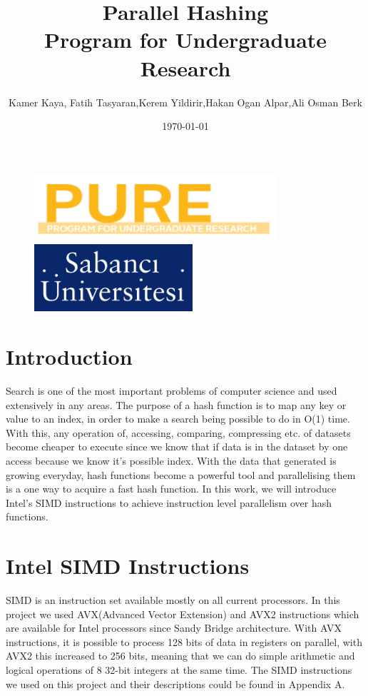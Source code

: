 \documentclass[11pt,oneside,a4paper]{article}
\title{\vspace*{40.0mm}
  \bf\sf Parallel Hashing
         \vspace*{20.0mm} \\
  \vspace*{40.0mm}
  \Large\bf\sf Program for Undergraduate Research \vspace*{20.0mm}}
\author{\sf Kamer Kaya, Fatih Tasyaran,Kerem Yildirir,Hakan Ogan Alpar,Ali Osman Berk}
\date{\sf \today}
\makeatletter
\def\cleardoublepage{\clearpage\if@twoside \ifodd\c@page\else%
\hbox{}%
\thispagestyle{empty}%
\clearpage%
\if@twocolumn\hbox{}\clearpage\fi\fi\fi}
\makeatother
\begin{document}
\begin{figure}
  \parbox[t]{40mm}{
    \begin{flushleft}
      \includegraphics[height=25mm]{pure.png}
    \end{flushleft}}
    \hspace{7cm}
  \parbox[t]{40mm}{
    \begin{flushright}
      \includegraphics[height=25mm]{sabanj.png}
    \end{flushright}}
\end{figure}

\maketitle
\thispagestyle{empty}
\raggedbottom

\cleardoublepage
{}
\setcounter{tocdepth}{2}
\tableofcontents


\section{Introduction}
\par Search is one of the most important problems of computer science and used extensively in any areas. The purpose of a hash function is to map any key or value to an index, in order to make a search being possible to do in O(1) time. With this, any operation of, accessing, comparing, compressing etc. of datasets become cheaper to execute since we know that if data is in the dataset by one access because we know it's possible index. With the data that generated is growing
everyday, hash functions become a powerful tool and parallelising them is a one way to acquire a fast hash function. In this work, we will introduce Intel's SIMD instructions to achieve instruction level parallelism over hash functions.
\section{Intel SIMD Instructions}
SIMD is an instruction set available mostly on all current processors. In this project we used AVX(Advanced Vector Extension) and AVX2 instructions which are available for Intel processors since Sandy Bridge architecture. With AVX instructions, it is possible to process 128 bits of data in registers on parallel, with AVX2 this increased to 256 bits, meaning that we can do simple arithmetic and logical operations of 8 32-bit integers at the same time. The SIMD instructions we used on this project and their descriptions could be found in Appendix A.
\end{document}
